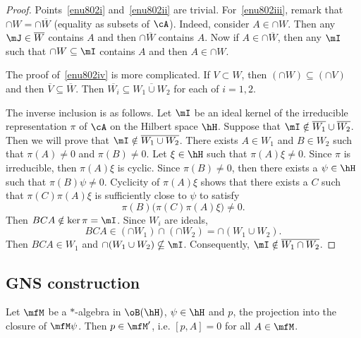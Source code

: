 \begin{proof}
Points~\ref{enu802i}  and~\ref{enu802ii} are trivial. For~\ref{enu802iii}, remark that $\cap W=\cap\overline{ W }$ (equality as subsets of $\cA$). Indeed, consider $A\in\cap W$. Then any $\mJ\in\overline{ W }$ contains $A$ and then $\cap\overline{ W }$ contains $A$. Now if $A\in\cap\overline{ W }$, then any $\mI$ such that $\cap W\subseteq\mI$ contains $A$ and then $A\in\cap W$.

The proof of~\ref{enu802iv} is more complicated. If $V\subset W$, then $(\cap W)\subseteq(\cap V)$ and then $\overline{ V }\subseteq\overline{ W }$. Then $\overline{ W_i }\subseteq\overline{ W_1\cup W_2 }$ for each of $i=1,2$.

The inverse inclusion is as follows. Let $\mI$ be an ideal kernel of the irreducible representation $\pi$ of $\cA$ on the Hilbert space $\hH$. Suppose that $\mI\notin \overline{ W_1 } \cup \overline{ W_2 }$. Then we will prove that $\mI\notin\overline{ W_1\cup W_2 }$. There exists $A\in W_1$ and $B\in W_2$ such that $\pi(A)\neq 0$ and $\pi(B)\neq0$. Let $\xi\in\hH$ such that $\pi(A)\xi\neq0$. Since $\pi$ is irreducible, then $\pi(A)\xi$ is cyclic. Since $\pi(B)\neq 0$, then there exists a $\psi\in\hH$ such that $\pi(B)\psi\neq0$. Cyclicity of $\pi(A)\xi$ shows that there exists a $C$ such that $\pi(C)\pi(A)\xi$ is sufficiently close to $\psi$ to satisfy
\[
  \pi(B)\big( \pi(C)\pi(A)\xi \big)\neq0.
\]
 Then $BCA\notin\ker\pi=\mI$. Since $W_i$ are ideals,
\[
  BCA\in(\cap W_1)\cap(\cap W_2)=\cap(W_1\cup W_2).
\]
Then $BCA\in W_1$ and $\cap(W_1\cup W_2)\nsubseteq\mI$. Consequently, $\mI\notin\overline{ W_1\cap W_2 }$.


\end{proof}


\subsection{GNS construction}

\begin{lemma}
Let $\mfM$ be a $*$-algebra in $\oB(\hH)$, $\psi\in\hH$ and $p$, the projection into the closure of $\mfM\psi$. Then $p\in\mfM'$, i.e. $[p,A]=0$ for all $A\in\mfM$.\label{lem_preGNS}
\end{lemma}

